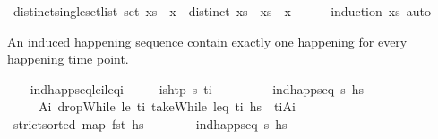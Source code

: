 \begin{isabellebody}
\ distinct{\isacharunderscore}{\kern0pt}single{\isacharunderscore}{\kern0pt}set{\isacharunderscore}{\kern0pt}list{\isacharcolon}{\kern0pt}\ {\isachardoublequoteopen}set\ xs\ {\isacharequal}{\kern0pt}\ {\isacharbraceleft}{\kern0pt}x{\isacharbraceright}{\kern0pt}\ {\isasymLongrightarrow}\ distinct\ xs\ {\isasymLongrightarrow}\ xs\ {\isacharequal}{\kern0pt}\ {\isacharbrackleft}{\kern0pt}x{\isacharbrackright}{\kern0pt}{\isachardoublequoteclose}\isanewline
%
\isadelimproof
\ \ \ \ %
\endisadelimproof
%
\isatagproof
{}\isamarkupfalse%
\ {\isacharparenleft}{\kern0pt}induction\ xs{\isacharparenright}{\kern0pt}\ auto%
\endisatagproof
{\isafoldproof}%
%
\isadelimproof
%
\endisadelimproof
%
\begin{isamarkuptext}%
An induced happening sequence contain exactly one happening for 
  every happening time point.%
\end{isamarkuptext}\isamarkuptrue%
\ \ \isamarkupfalse%
\ ind{\isacharunderscore}{\kern0pt}happ{\isacharunderscore}{\kern0pt}seq{\isacharunderscore}{\kern0pt}le\isactrlsub i{\isacharunderscore}{\kern0pt}leq\isactrlsub i{\isacharcolon}{\kern0pt}\isanewline
\ \ \ \ \ {\isachardoublequoteopen}is{\isacharunderscore}{\kern0pt}htp\ {\isasympi}s\ t\isactrlsub i{\isachardoublequoteclose}\isanewline
\ \ \ \ \ \ \ \ \ {\isachardoublequoteopen}ind{\isacharunderscore}{\kern0pt}happ{\isacharunderscore}{\kern0pt}seq\ {\isasympi}s\ hs{\isachardoublequoteclose}\isanewline
\ \ \ \ \ {\isachardoublequoteopen}{\isasymexists}A\isactrlsub i{\isachardot}{\kern0pt}\ dropWhile\ {\isacharparenleft}{\kern0pt}le\ t\isactrlsub i{\isacharparenright}{\kern0pt}\ {\isacharparenleft}{\kern0pt}takeWhile\ {\isacharparenleft}{\kern0pt}leq\ t\isactrlsub i{\isacharparenright}{\kern0pt}\ hs{\isacharparenright}{\kern0pt}\ {\isacharequal}{\kern0pt}\ {\isacharbrackleft}{\kern0pt}{\isacharparenleft}{\kern0pt}t\isactrlsub i{\isacharcomma}{\kern0pt}A\isactrlsub i{\isacharparenright}{\kern0pt}{\isacharbrackright}{\kern0pt}{\isachardoublequoteclose}\isanewline
%
\isadelimproof
\ \ %
\endisadelimproof
%
\isatagproof
{}\isamarkupfalse%
\ {\isacharminus}{\kern0pt}\isanewline
\ \ \ \ \isamarkupfalse%
\ {\isachardoublequoteopen}strict{\isacharunderscore}{\kern0pt}sorted\ {\isacharparenleft}{\kern0pt}map\ fst\ hs{\isacharparenright}{\kern0pt}{\isachardoublequoteclose}\isanewline
\ \ \ \ \ \ \isamarkupfalse%
\ {\isacartoucheopen}ind{\isacharunderscore}{\kern0pt}happ{\isacharunderscore}{\kern0pt}seq\ {\isasympi}s\ hs{\isacartoucheclose}\isanewline

\end{isabellebody}
